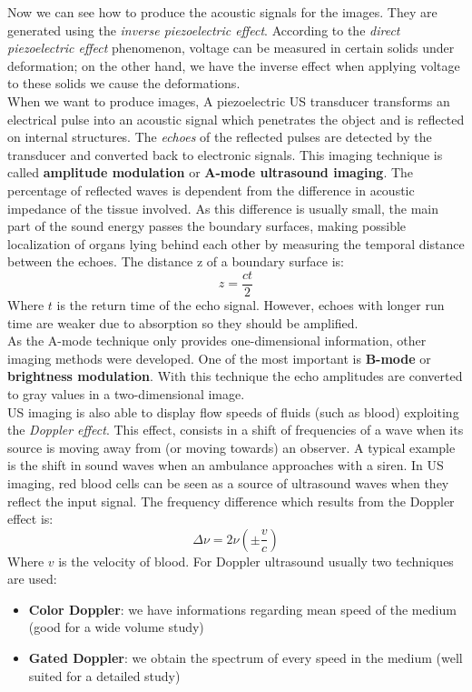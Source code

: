 Now we can see how to produce the acoustic signals for the images. They are generated using the \textit{inverse piezoelectric effect}. According to the \textit{direct piezoelectric effect} phenomenon, voltage can be measured in certain solids under deformation; on the other hand, we have the inverse effect when applying voltage to these solids we cause the deformations.\\
When we want to produce images, A piezoelectric US transducer transforms an electrical pulse into an acoustic signal which penetrates the object and is reflected on internal structures. The \textit{echoes} of the reflected pulses are detected by the transducer and converted back to electronic signals. This imaging technique is called \textbf{amplitude modulation} or \textbf{A-mode ultrasound imaging}. The percentage of reflected waves is dependent from the difference in acoustic impedance of the tissue involved. As this difference is usually small, the main part of the sound energy passes the boundary surfaces, making possible localization of organs lying behind each other by measuring the temporal distance between the echoes. The distance z of a boundary surface is:
\begin{equation}
 z = \frac{ct}{2}
\end{equation}
Where $t$ is the return time of the echo signal. However, echoes with longer run time are weaker due to absorption so they should be amplified.\\

As the A-mode technique only provides one-dimensional information, other imaging methods were developed. One of the most important is \textbf{B-mode} or \textbf{brightness modulation}. With this technique the echo amplitudes are converted to gray values in a two-dimensional image.\\

US imaging is also able to display flow speeds of fluids (such as blood) exploiting the \textit{Doppler effect}. This effect, consists in a shift of frequencies of a wave when its source is moving away from (or moving towards) an observer. A typical example is the shift in sound waves when an ambulance approaches with a siren. In US imaging, red blood cells can be seen as a source of ultrasound waves when they reflect the input signal. The frequency difference which results from the Doppler effect is:
\begin{equation}
 \Delta \nu = 2 \nu (\pm \frac{v}{c})
\end{equation}
Where $v$ is the velocity of blood. For Doppler ultrasound usually two techniques are used:
\begin{itemize}
 \item \textbf{Color Doppler}: we have informations regarding mean speed of the medium (good for a wide volume study)
 \item \textbf{Gated Doppler}: we obtain the spectrum of every speed in the medium (well suited for a detailed study)
\end{itemize}

